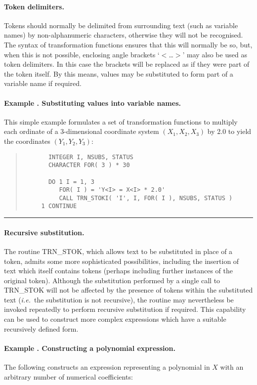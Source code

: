 \documentclass[twoside,11pt]{article}
\newcommand{\name}[1]{\mbox{\small{#1}}}
\newcounter{examplecounter}
\newcommand{\example}[1]{\addtocounter{examplecounter}{1}
                         \paragraph{\textbf{Example \theexamplecounter. #1}}}
\newcommand{\exampledone}[0]{\begin{center} \rule{6em}{0.2mm} \end{center}}
\begin{document}
\paragraph{Token delimiters.}
Tokens should normally be delimited from surrounding text (such as variable
names) by non-alphanumeric characters, otherwise they will not be 
recognised.
The syntax of transformation functions ensures that this will normally be 
so, but, when this is not possible, enclosing angle brackets `$<$\ldots $>$'
may also be used as token delimiters. 
In this case the brackets will be replaced as if they were part of the token
itself. 
By this means, values may be substituted to form part of a variable name if 
required.

\example{Substituting values into variable names.}
This simple example formulates a set of transformation functions to multiply
each ordinate of a 3-dimensional coordinate system \mbox{$(X_1,X_2,X_3)$} by
2.0 to yield the coordinates \mbox{$(Y_1,Y_2,Y_3)$}: 

\begin{quote}
\begin{verbatim}
       INTEGER I, NSUBS, STATUS
       CHARACTER FOR( 3 ) * 30
 
       DO 1 I = 1, 3
          FOR( I ) = 'Y<I> = X<I> * 2.0'
          CALL TRN_STOKI( 'I', I, FOR( I ), NSUBS, STATUS )
     1 CONTINUE
\end{verbatim}
\end{quote}
\exampledone

\paragraph{Recursive substitution.}
The routine \name{TRN\_STOK}, which allows text to be substituted in place
of a token, admits some more sophisticated possibilities, including the
insertion of text which itself contains tokens (perhaps including further
instances of the original token). 
Although the substitution performed by a single call to \name{TRN\_STOK} 
will not be affected by the presence of tokens within the substituted text 
(\emph{i.e.}\ the substitution is not recursive), the routine may nevertheless 
be invoked repeatedly to perform recursive substitution if required.
This capability can be used to construct more complex expressions which have
a suitable recursively defined form. 

\example{Constructing a polynomial expression.}
The following constructs an expression representing a polynomial in $X$ with
an arbitrary number of numerical coefficients: 
\end{document}
